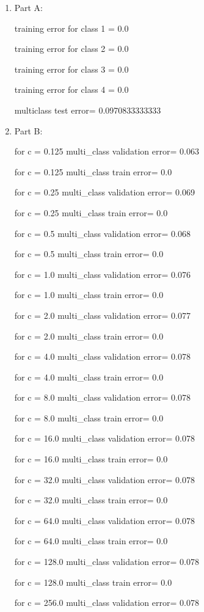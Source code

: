 \documentclass[12pt]{article}
\begin{document}
\begin{enumerate}

\item Part A:

training error for class 1 = 0.0

training error for class 2 = 0.0

training error for class 3 = 0.0

training error for class 4 = 0.0

multiclass test error= 0.0970833333333


\item Part B:

for c = 0.125 multi\_class validation error= 0.063

for c = 0.125 multi\_class train error= 0.0

for c = 0.25 multi\_class validation error= 0.069

for c = 0.25 multi\_class train error= 0.0

for c = 0.5 multi\_class validation error= 0.068

for c = 0.5 multi\_class train error= 0.0

for c = 1.0 multi\_class validation error= 0.076

for c = 1.0 multi\_class train error= 0.0

for c = 2.0 multi\_class validation error= 0.077

for c = 2.0 multi\_class train error= 0.0

for c = 4.0 multi\_class validation error= 0.078

for c = 4.0 multi\_class train error= 0.0

for c = 8.0 multi\_class validation error= 0.078

for c = 8.0 multi\_class train error= 0.0

for c = 16.0 multi\_class validation error= 0.078

for c = 16.0 multi\_class train error= 0.0

for c = 32.0 multi\_class validation error= 0.078

for c = 32.0 multi\_class train error= 0.0

for c = 64.0 multi\_class validation error= 0.078

for c = 64.0 multi\_class train error= 0.0

for c = 128.0 multi\_class validation error= 0.078

for c = 128.0 multi\_class train error= 0.0

for c = 256.0 multi\_class validation error= 0.078


\end{enumerate}
\end{document}
